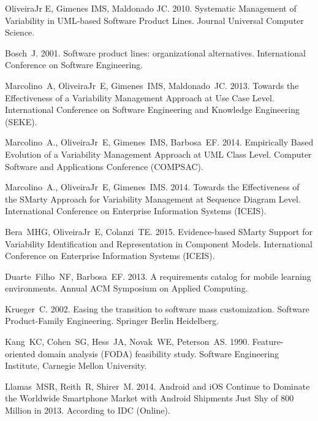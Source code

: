 \documentclass{kais}
\begin{document}
\begin{thebibliography}{99}
 OliveiraJr E, Gimenes IMS, Maldonado JC. 2010. Systematic Management of Variability in UML-based Software Product Lines. Journal Universal Computer Science.

 Bosch~J. 2001. Software product lines: organizational alternatives. International Conference on Software Engineering.

 Marcolino~A, OliveiraJr~E, Gimenes~IMS, Maldonado~JC. 2013. Towards the Effectiveness of a Variability Management Approach at Use Case Level. International Conference on Software Engineering and Knowledge Engineering (SEKE).

 Marcolino~A., OliveiraJr~E, Gimenes~IMS, Barbosa~EF. 2014. Empirically Based Evolution of a Variability Management Approach at UML Class Level. Computer Software and Applications Conference (COMPSAC).

 Marcolino~A., OliveiraJr~E, Gimenes~IMS. 2014. Towards the Effectiveness of the SMarty Approach for Variability Management at Sequence Diagram Level. International Conference on Enterprise Information Systems (ICEIS).

 Bera~MHG, OliveiraJr~E, Colanzi~TE. 2015. Evidence-based SMarty Support for Variability Identification and Representation in Component Models. International Conference on Enterprise Information Systems (ICEIS).

 Duarte~Filho~NF, Barbosa~EF. 2013. A requirements catalog for mobile learning environments. Annual ACM Symposium on Applied Computing.

 Krueger~C. 2002. Easing the transition to software mass customization. Software Product-Family Engineering. Springer Berlin Heidelberg.

 Kang~KC, Cohen~SG, Hess~JA, Novak~WE, Peterson~AS. 1990. Feature-oriented domain analysis (FODA) feasibility study. Software Engineering Institute, Carnegie Mellon University.

 Llamas~MSR, Reith~R, Shirer~M. 2014. Android and iOS Continue to Dominate the Worldwide Smartphone Market with Android Shipments Just Shy of 800 Million in 2013. According to IDC (Online).


\end{thebibliography}
\end{document}
